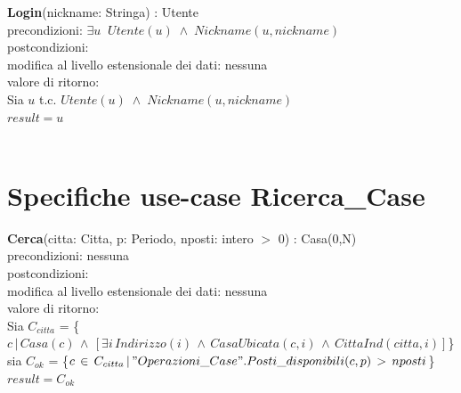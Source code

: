 \documentclass[a4paper,12pt]{report}
\begin{document}
        \hspace*{-1cm}
        \textbf{Login}(nickname: Stringa) : Utente \\
        \hspace*{1cm} precondizioni: $\exists u \;\; Utente(u) \; \wedge \; Nickname(u, nickname)$ \\
        \hspace*{1cm} postcondizioni: \\
        \hspace*{2cm} modifica al livello estensionale dei dati: nessuna \\
        \hspace*{2cm} valore di ritorno: \\
        \hspace*{3cm} Sia $u$ t.c. $Utente(u) \; \wedge \; Nickname(u, nickname)$ \\
        \hspace*{3cm} $result = u$ \\ \\

      \newpage

      \section*{Specifiche use-case Ricerca\_Case}
        \textbf{Cerca}(citta: Citta, p: Periodo, nposti: intero $>$ 0) : Casa(0,N) \\
        \hspace*{1cm} precondizioni: nessuna \\
        \hspace*{1cm} postcondizioni: \\
        \hspace*{2cm} modifica al livello estensionale dei dati: nessuna \\
        \hspace*{2cm} valore di ritorno: \\
        \hspace*{3cm} Sia $C_{citta}$ = \{$c \, | \, Casa(c) \, \wedge \, [\exists i \, Indirizzo(i) \, \wedge \, CasaUbicata(c, i) \, \wedge \, CittaInd(citta, i)]$\} \\
        \hspace*{3cm} sia $C_{ok}$ = \{$c \, \in \, C_{citta} \, | \, "Operazioni\_Case".Posti\_disponibili(c, p) \, > \, nposti$\} \\
        \hspace*{3cm} $result = C_{ok}$ \\ \\
\end{document}

